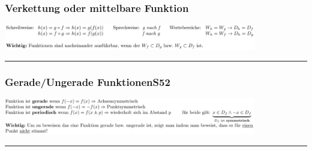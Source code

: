 \documentclass[6pt,a4paper]{scrartcl}
\begin{document}
\begin{multicols*}{2}
\subsubsection{Verkettung oder mittelbare Funktion}
\includegraphics[width=11cm]{Verkettung.PNG}\\
\hrule
\subsubsection{Gerade/Ungerade Funktionen\color{red}S52}
\includegraphics[width=11cm]{GrUgrFnkt.PNG}\\
\hrule

\end{multicols*}
\end{document}
